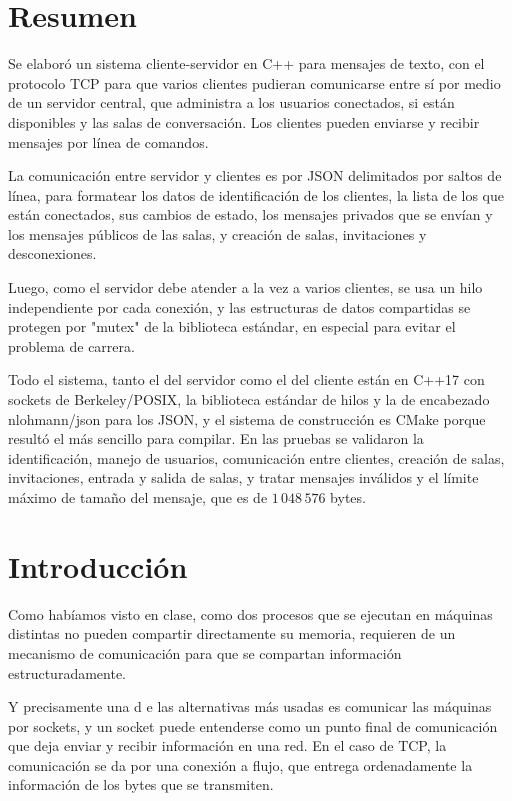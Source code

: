 \documentclass[12pt,letterpaper]{article}
\begin{document}
\section*{Resumen}

Se elaboró un sistema cliente-servidor en C++
para mensajes de texto, con el protocolo TCP para que varios clientes pudieran comunicarse entre sí por medio de  un servidor central, que
administra a los usuarios conectados, si están disponibles y las salas de conversación. Los clientes pueden enviarse
y recibir mensajes por línea de comandos.

La comunicación entre servidor y clientes es por JSON
delimitados por saltos de línea, para formatear los datos de
identificación de los clientes, la lista de los que están conectados, sus cambios de
estado, los mensajes privados que se envían y los mensajes públicos de las salas, y creación de
salas, invitaciones y desconexiones.

Luego, como el servidor debe atender a la vez a varios clientes, se
usa un hilo independiente por cada conexión, y las estructuras de datos
compartidas se protegen por "mutex" de la
biblioteca estándar, en especial para evitar el problema de carrera.

Todo el sistema, tanto el del servidor como el del cliente están en C++17 con sockets de Berkeley/POSIX,
la biblioteca estándar de hilos y la de encabezado nlohmann/json para los JSON, y el sistema de construcción es CMake porque resultó el más sencillo para compilar. En las pruebas se validaron la identificación, manejo de usuarios, comunicación entre clientes, creación
de salas, invitaciones, entrada y salida de salas, y tratar mensajes inválidos y el límite máximo de tamaño del mensaje, que es de
$1\,048\,576$ bytes.

\section{Introducción}

Como habíamos visto en clase, como dos procesos que se ejecutan en máquinas
distintas no pueden compartir directamente su memoria, requieren de
un mecanismo de comunicación para que se compartan información estructuradamente.

Y precisamente una d e las alternativas más usadas es
comunicar las máquinas por sockets, y un socket puede entenderse como un punto
final de comunicación que deja enviar y recibir información
en una red. En el caso de TCP, la comunicación se da
por una conexión a flujo, que entrega ordenadamente la información de los bytes que se transmiten.
\end{document}
